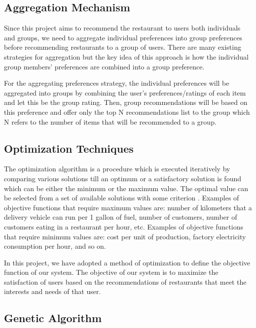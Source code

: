 \documentclass[12pt,oneside,openright,a4paper]{cpe-english-project}
\begin{document}
        

\subsection{Aggregation Mechanism}

Since this project aims to recommend the restaurant to users both individuals and groups, we need to aggregate individual preferences into group preferences before recommending restaurants to a group of users. There are many existing strategies for aggregation but the key idea of this approach is how the individual group members’ preferences are combined into a group preference.

For the aggregating preferences strategy, the individual preferences will be aggregated into groups by combining the user’s preferences/ratings of each item and let this be the group rating. Then, group recommendations will be based on this preference and offer only the top N recommendations list to the group which N refers to the number of items that will be recommended to a group.

\subsection{Optimization Techniques}

The optimization algorithm is a procedure which is executed iteratively by comparing various solutions till an optimum or a satisfactory solution is found \cite{AlgorithmsforDiscreteOptimization} which can be either the minimum or the maximum value. The optimal value can be selected from a set of available solutions with some criterion \cite{Mathematicaloptimization}. Examples of objective functions that require maximum values ​​are: number of kilometers that a delivery vehicle can run per 1 gallon of fuel, number of customers, number of customers eating in a restaurant per hour, etc. Examples of objective functions that require minimum values ​​are: cost per unit of production, factory electricity consumption per hour, and so on.

In this project, we have adopted a method of optimization to define the objective function of our system. The objective of our system is to maximize the satisfaction of users based on the recommendations of restaurants that meet the interests and needs of that user.

\subsection{Genetic Algorithm}
\end{document}

